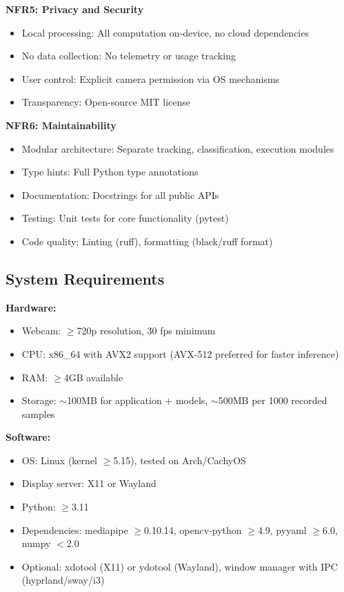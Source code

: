 \documentclass[11pt,a4paper]{article}
\begin{document}
\textbf{NFR5: Privacy and Security}
\begin{itemize}
\item Local processing: All computation on-device, no cloud dependencies
\item No data collection: No telemetry or usage tracking
\item User control: Explicit camera permission via OS mechanisms
\item Transparency: Open-source MIT license
\end{itemize}

\textbf{NFR6: Maintainability}
\begin{itemize}
\item Modular architecture: Separate tracking, classification, execution modules
\item Type hints: Full Python type annotations
\item Documentation: Docstrings for all public APIs
\item Testing: Unit tests for core functionality (pytest)
\item Code quality: Linting (ruff), formatting (black/ruff format)
\end{itemize}

\subsection{System Requirements}

\textbf{Hardware:}
\begin{itemize}
\item Webcam: $\geq$720p resolution, 30 fps minimum
\item CPU: x86\_64 with AVX2 support (AVX-512 preferred for faster inference)
\item RAM: $\geq$4GB available
\item Storage: $\sim$100MB for application + models, $\sim$500MB per 1000 recorded samples
\end{itemize}

\textbf{Software:}
\begin{itemize}
\item OS: Linux (kernel $\geq$5.15), tested on Arch/CachyOS
\item Display server: X11 or Wayland
\item Python: $\geq$3.11
\item Dependencies: mediapipe $\geq$0.10.14, opencv-python $\geq$4.9, pyyaml $\geq$6.0, numpy $<$2.0
\item Optional: xdotool (X11) or ydotool (Wayland), window manager with IPC (hyprland/sway/i3)
\end{itemize}
\end{document}
